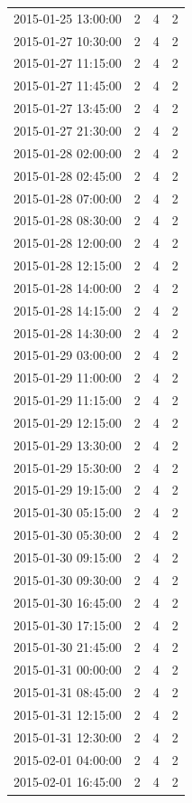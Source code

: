 \begin{tabular}{lrrr}
2015-01-25 13:00:00 & 2 & 4 & 2 \\
2015-01-27 10:30:00 & 2 & 4 & 2 \\
2015-01-27 11:15:00 & 2 & 4 & 2 \\
2015-01-27 11:45:00 & 2 & 4 & 2 \\
2015-01-27 13:45:00 & 2 & 4 & 2 \\
2015-01-27 21:30:00 & 2 & 4 & 2 \\
2015-01-28 02:00:00 & 2 & 4 & 2 \\
2015-01-28 02:45:00 & 2 & 4 & 2 \\
2015-01-28 07:00:00 & 2 & 4 & 2 \\
2015-01-28 08:30:00 & 2 & 4 & 2 \\
2015-01-28 12:00:00 & 2 & 4 & 2 \\
2015-01-28 12:15:00 & 2 & 4 & 2 \\
2015-01-28 14:00:00 & 2 & 4 & 2 \\
2015-01-28 14:15:00 & 2 & 4 & 2 \\
2015-01-28 14:30:00 & 2 & 4 & 2 \\
2015-01-29 03:00:00 & 2 & 4 & 2 \\
2015-01-29 11:00:00 & 2 & 4 & 2 \\
2015-01-29 11:15:00 & 2 & 4 & 2 \\
2015-01-29 12:15:00 & 2 & 4 & 2 \\
2015-01-29 13:30:00 & 2 & 4 & 2 \\
2015-01-29 15:30:00 & 2 & 4 & 2 \\
2015-01-29 19:15:00 & 2 & 4 & 2 \\
2015-01-30 05:15:00 & 2 & 4 & 2 \\
2015-01-30 05:30:00 & 2 & 4 & 2 \\
2015-01-30 09:15:00 & 2 & 4 & 2 \\
2015-01-30 09:30:00 & 2 & 4 & 2 \\
2015-01-30 16:45:00 & 2 & 4 & 2 \\
2015-01-30 17:15:00 & 2 & 4 & 2 \\
2015-01-30 21:45:00 & 2 & 4 & 2 \\
2015-01-31 00:00:00 & 2 & 4 & 2 \\
2015-01-31 08:45:00 & 2 & 4 & 2 \\
2015-01-31 12:15:00 & 2 & 4 & 2 \\
2015-01-31 12:30:00 & 2 & 4 & 2 \\
2015-02-01 04:00:00 & 2 & 4 & 2 \\
2015-02-01 16:45:00 & 2 & 4 & 2 \\

\end{tabular}
